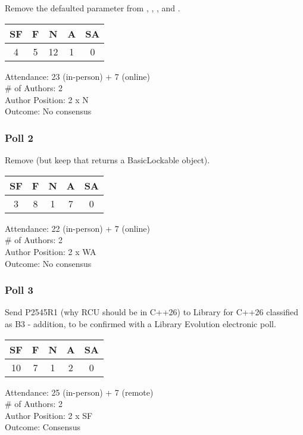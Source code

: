 Remove the defaulted  parameter from
, , , and
.

\begin{tabular}{c|c|c|c|c}
SF & F &  N & A & SA \\
\hline
 4 & 5 & 12 & 1 &  0 \\
\end{tabular}

Attendance: 23 (in-person) + 7 (online) \\
\# of Authors: 2 \\
Author Position: 2 x N \\
Outcome: No consensus \\

\subsubsection{Poll 2}
\label{sec:kona2022:Poll 2}

Remove  (but keep  that returns a BasicLockable object).

\begin{tabular}{c|c|c|c|c}
SF & F &  N & A & SA \\
\hline
 3 & 8 &  1 & 7 &  0 \\
\end{tabular}

Attendance: 22 (in-person) + 7 (online) \\
\# of Authors: 2 \\
Author Position: 2 x WA \\
Outcome: No consensus \\

\subsubsection{Poll 3}
\label{sec:kona2022:Poll 3}

Send P2545R1 (why RCU should be in C++26) to Library for C++26 classified as B3 - addition, to be confirmed with a Library Evolution electronic poll.

\begin{tabular}{c|c|c|c|c}
SF & F &  N & A & SA \\
\hline
10 & 7 &  1 & 2 &  0 \\
\end{tabular}

Attendance: 25 (in-person) + 7 (remote) \\
\# of Authors: 2 \\
Author Position: 2 x SF \\
Outcome: Consensus \\

